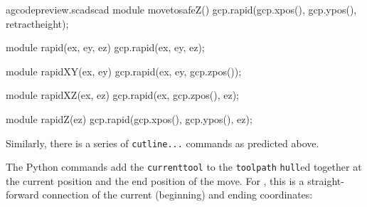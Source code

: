 \documentclass{ltxdoc}
\begin{document}
\lstset{firstnumber=\thegcpscad}
\begin{writecode}{a}{gcodepreview.scad}{scad}
module movetosafeZ(){
    gcp.rapid(gcp.xpos(), gcp.ypos(), retractheight);
}

module rapid(ex, ey, ez) {
    gcp.rapid(ex, ey, ez);
}

module rapidXY(ex, ey) {
    gcp.rapid(ex, ey, gcp.zpos());
}

module rapidXZ(ex, ez) {
    gcp.rapid(ex, gcp.zpos(), ez);
}

module rapidZ(ez) {
    gcp.rapid(gcp.xpos(), gcp.ypos(), ez);
}

\end{writecode}
\addtocounter{gcpscad}{20}

Similarly, there is a series of \verb|cutline...| commands as predicted above.

The Python commands  add the \verb|currenttool| to the \verb|toolpath| \verb|hull|ed together at the current position and the end position of the move. For , this is a straight-forward connection of the current (beginning) and ending coordinates:
\end{document}
